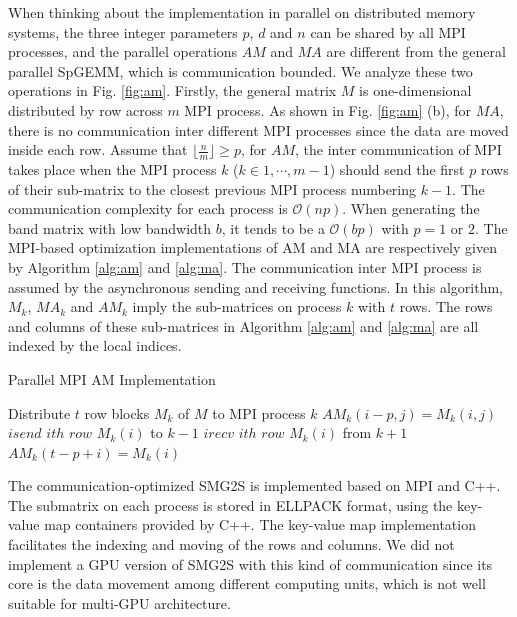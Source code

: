 When thinking about the implementation in parallel on distributed memory systems, the three integer parameters $p$, $d$ and $n$ can be shared by all MPI processes, and the parallel operations $AM$ and $MA$ are different from the general parallel SpGEMM, which is communication bounded. We analyze these two operations in Fig. \ref{fig:am}. Firstly, the general matrix $M$  is one-dimensional distributed by row across $m$ MPI process. As shown in  Fig. \ref{fig:am} (b), for $MA$, there is no communication inter different MPI processes since the data are moved inside each row. Assume that $ \lfloor \frac{n}{m}\rfloor \geq p$, for $AM$, the inter communication of MPI takes place when the MPI process $k$ ($k \in 1, \cdots, m-1$) should send the first $p$ rows of their sub-matrix to the closest previous MPI process numbering $k-1$. The communication complexity for each process is $\mathcal{O}(np)$. When generating the band matrix with low bandwidth $b$, it tends to be a $\mathcal{O}(bp)$ with $p=1$ or $2$. The MPI-based optimization implementations of AM and MA are respectively given by Algorithm \ref{alg:am} and \ref{alg:ma}. The communication inter MPI process is assumed by the asynchronous sending and receiving functions. In this algorithm, $M_k$, $MA_k$ and $AM_k$ imply the sub-matrices on process $k$ with $t$ rows. The rows and columns of these sub-matrices in Algorithm \ref{alg:am} and \ref{alg:ma} are all indexed by the local indices.

\begin{algorithm}[htbp]{}
	\caption{Parallel MPI AM Implementation}   
	\label{alg:am}   
	\begin{algorithmic}[1]
		\State Distribute $t$ row blocks $M_k$ of $M$ to MPI process $k$
		\State $AM_k(i-p,j) = M_k(i,j)$
		\EndIf
		\EndFor
		\EndFor
		\State $isend$ $ith$ $row$ $M_k(i)$ to $k-1$
		\EndIf
		\State $irecv$ $ith$ $row$ $M_k(i)$ from $k+1$
		\State $AM_k(t-p+i)=M_k(i)$
		\EndIf
		\EndFor
		\EndFunction
		
	\end{algorithmic}  
	
\end{algorithm}

The communication-optimized SMG2S is implemented based on MPI and C++. The submatrix on each process is stored in ELLPACK format, using the key-value map containers provided by C++. The key-value map implementation facilitates the indexing and moving of the rows and columns. We did not implement a GPU version of SMG2S with this kind of communication since its core is the data movement among different computing units, which is not well suitable for multi-GPU architecture.


